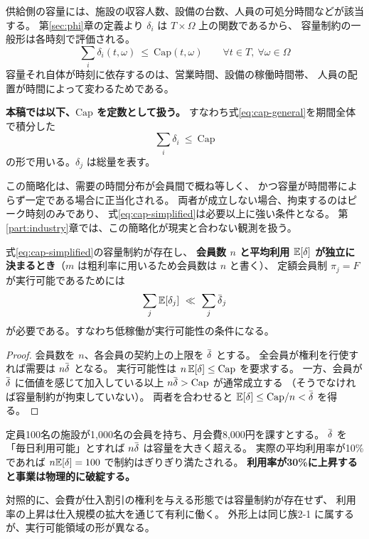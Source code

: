 \begin{remark}[容量制約の一般形と本稿の簡略化]
\label{rem:cap-simplification}
供給側の容量には、施設の収容人数、設備の台数、人員の可処分時間などが該当する。
第\ref{sec:phi}章の定義より $\delta_i$ は $T\times\Omega$ 上の関数であるから、
容量制約の一般形は各時刻で評価される。
\begin{equation}
\sum_i \delta_i(t,\omega) \ \leq\ \mathrm{Cap}(t,\omega)
\qquad \forall t\in T,\ \forall\omega\in\Omega
\label{eq:cap-general}
\end{equation}
容量それ自体が時刻に依存するのは、営業時間、設備の稼働時間帯、
人員の配置が時間によって変わるためである。

\textbf{本稿では以下、$\mathrm{Cap}$ を定数として扱う。}
すなわち式\eqref{eq:cap-general}を期間全体で積分した
\begin{equation}
\sum_i \delta_i \ \leq\ \mathrm{Cap}
\label{eq:cap-simplified}
\end{equation}
の形で用いる。$\delta_j$ は総量を表す。

この簡略化は、需要の時間分布が会員間で概ね等しく、
かつ容量が時間帯によらず一定である場合に正当化される。
両者が成立しない場合、拘束するのはピーク時刻のみであり、
式\eqref{eq:cap-simplified}は必要以上に強い条件となる。
第\ref{part:industry}章では、この簡略化が現実と合わない観測を扱う。
\end{remark}

\begin{proposition}[容量制約下の会員制]
\label{prop:capacity}
式\eqref{eq:cap-simplified}の容量制約が存在し、
\textbf{会員数 $n$ と平均利用 $\mathbb{E}[\delta]$ が独立に決まるとき}（$m$ は粗利率に用いるため会員数は $n$ と書く）、
定額会員制 $\pi_j=F$ が実行可能であるためには
\begin{equation}
\sum_{j}\E[\delta_j] \ \ll\ \sum_{j}\dbar_j
\end{equation}
が必要である。すなわち低稼働が実行可能性の条件になる。
\end{proposition}

\begin{proof}
会員数を $n$、各会員の契約上の上限を $\dbar$ とする。
全会員が権利を行使すれば需要は $n\dbar$ となる。
実行可能性は $n\,\mathbb{E}[\delta] \leq \mathrm{Cap}$ を要求する。
一方、会員が $\dbar$ に価値を感じて加入している以上 $n\dbar > \mathrm{Cap}$ が通常成立する
（そうでなければ容量制約が拘束していない）。
両者を合わせると $\E[\delta] \leq \mathrm{Cap}/n < \dbar$ を得る。
\end{proof}

\begin{example}[二種の会員制]
定員100名の施設が1,000名の会員を持ち、月会費8,000円を課すとする。
$\dbar$ を「毎日利用可能」とすれば $n\dbar$ は容量を大きく超える。
実際の平均利用率が10\%であれば $n\mathbb{E}[\delta]=100$ で制約はぎりぎり満たされる。
\textbf{利用率が30\%に上昇すると事業は物理的に破綻する。}

対照的に、会費が仕入割引の権利を与える形態では容量制約が存在せず、
利用率の上昇は仕入規模の拡大を通じて有利に働く。
外形上は同じ族2-1 に属するが、実行可能領域の形が異なる。
\end{example}

